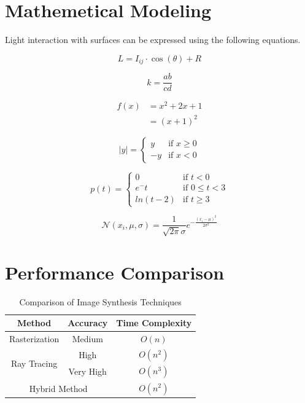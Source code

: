 \documentclass{article}
\begin{document}
\section{Mathemetical Modeling}
Light interaction with surfaces can be expressed using the following equations.

\begin{equation}
    L = I_{ij} \cdot \cos(\theta) + R
\end{equation}

$$k = \frac{ab}{cd}$$

\begin{align*}
    f(x) &= x^2 + 2x + 1\\
        &= (x+1)^2\tag{2}
\end{align*}

\[
\lvert y \rvert = 
\begin{cases}
    y & \text{if } x \geq 0 \\
    -y  & \text{if } x < 0
\end{cases}
\]

\[
p(t) = 
\begin{cases}
    0 & \text{if } t < 0 \\
    e^-t  & \text{if } 0 \leq t < 3 \\
    ln(t-2) & \text{if } t \geq 3
\end{cases}
\]

$$ \mathcal{N}(x_i, \mu, \sigma) = \frac{1}{\sqrt{2\pi}\sigma}e^{-{\frac{ ({x_i-\mu})^2}{2\sigma^2}}} $$

\section{Performance Comparison}

\begin{table}[!h]
    \centering
    \begin{tabular}{|c|c|c|}
    \hline
         Method & Accuracy & Time Complexity  \\ \hline
         Rasterization & Medium & $O(n)$ \\ \hline 
        \multirow{2}{2cm}{Ray Tracing} & High & $O(n^2)$ \\
        & Very High & $O(n^3)$ \\ \hline
        \multicolumn{2}{|c|}{Hybrid Method} & $O(n^2)$ \\ \hline
    \end{tabular}
    \caption{Comparison of Image Synthesis Techniques}
    \label{tab:comparison}
\end{table}
\end{document}
